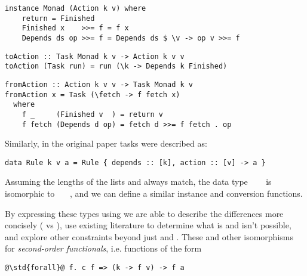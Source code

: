 \vspace{0.5mm}
\begin{verbatim}
instance Monad (Action k v) where
    return = Finished
    Finished x    >>= f = f x
    Depends ds op >>= f = Depends ds $ \v -> op v >>= f
\end{verbatim}
\begin{verbatim}
toAction :: Task Monad k v -> Action k v v
toAction (Task run) = run (\k -> Depends k Finished)
\end{verbatim}
\begin{verbatim}
fromAction :: Action k v v -> Task Monad k v
fromAction x = Task (\fetch -> f fetch x)
  where
    f _     (Finished v  ) = return v
    f fetch (Depends d op) = fetch d >>= f fetch . op
\end{verbatim}
\vspace{0.5mm}

\noindent
Similarly, in the original paper \Make tasks were described as:

\vspace{1mm}
\begin{verbatim}
data Rule k v a = Rule { depends :: [k], action :: [v] -> a }
\end{verbatim}
\vspace{1mm}
\noindent
Assuming the lengths of the lists \hs{[@@k]} and \hs{[@@v]} always match, the
data type ~~~ is isomorphic to
~~~, and we can define a similar
 instance and conversion functions.

By expressing these types
using  we are able to describe the differences more concisely
( vs ), use existing literature to determine what is
and isn't possible, and explore other constraints beyond just  and
.
These and other isomorphisms for \emph{second-order functionals}, i.e.
functions of the form

\vspace{1mm}
\begin{center}
\begin{minipage}{0.5\textwidth}
\begin{verbatim}
@\std{forall}@ f. c f => (k -> f v) -> f a
\end{verbatim}
\end{minipage}
\end{center}
\vspace{1mm}

